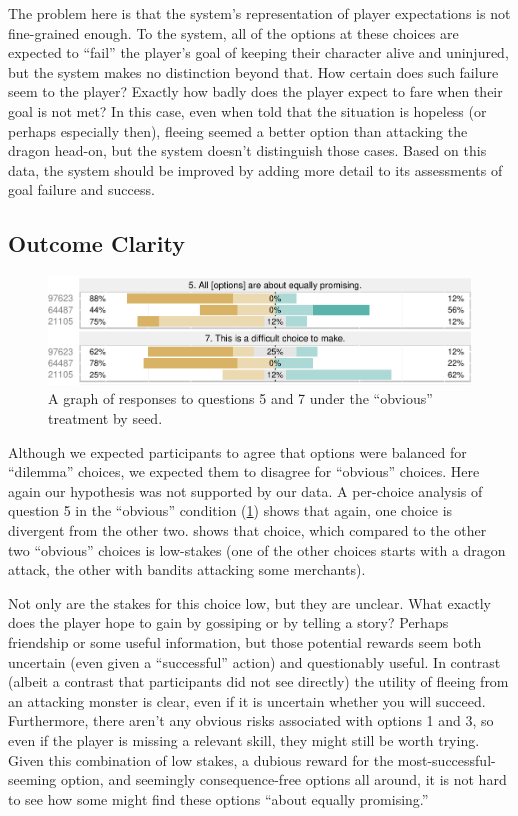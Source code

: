 The problem here is that the system's representation of player expectations is not fine-grained enough.
%
To the system, all of the options at these choices are expected to ``fail'' the player's goal of keeping their character alive and uninjured, but the system makes no distinction beyond that.
%
How certain does such failure seem to the player?
%
Exactly how badly does the player expect to fare when their goal is not met?
%
In this case, even when told that the situation is hopeless (or perhaps especially then), fleeing seemed a better option than attacking the dragon head-on, but the system doesn't distinguish those cases.
%
Based on this data, the system should be improved by adding more detail to its assessments of goal failure and success.


\subsection{Outcome Clarity}


\begin{figure}[!h]
  \includegraphics[width=\textwidth]{fig/obvious-q5-q7.pdf}
  \caption{A graph of responses to questions 5 and 7 under the ``obvious'' treatment by seed.}
  \label{fig:obviousq57}
\end{figure}


Although we expected participants to agree that options were balanced for ``dilemma'' choices, we expected them to disagree for ``obvious'' choices.
%
Here again our hypothesis was not supported by our data.
%
A per-choice analysis of question 5 in the ``obvious'' condition (\cref{fig:obviousq57}) shows that again, one choice is divergent from the other two.
%
 shows that choice, which compared to the other two ``obvious'' choices is low-stakes (one of the other choices starts with a dragon attack, the other with bandits attacking some merchants).


Not only are the stakes for this choice low, but they are unclear.
%
What exactly does the player hope to gain by gossiping or by telling a story?
%
Perhaps friendship or some useful information, but those potential rewards seem both uncertain (even given a ``successful'' action) and questionably useful.
%
In contrast (albeit a contrast that participants did not see directly) the utility of fleeing from an attacking monster is clear, even if it is uncertain whether you will succeed.
%
Furthermore, there aren't any obvious risks associated with options 1 and 3, so even if the player is missing a relevant skill, they might still be worth trying.
%
Given this combination of low stakes, a dubious reward for the most-successful-seeming option, and seemingly consequence-free options all around, it is not hard to see how some might find these options ``about equally promising.''


